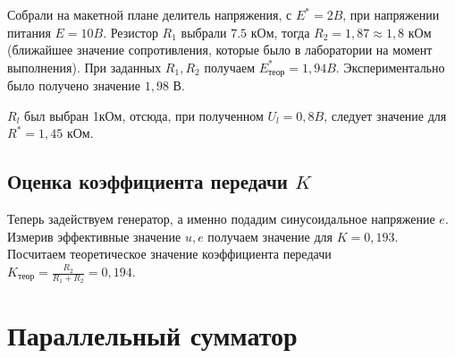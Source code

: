 \documentclass[a4paper, 12pt]{article}%
\begin{document}
Собрали на макетной плане делитель напряжения, с $E^{*} = 2 B$, при напряжении питания $E = 10 B$. Резистор $R_1$ выбрали $7.5 $ кОм, тогда $R_2 = 1,87 \approx 1,8$ кОм (ближайшее значение сопротивления, которые было в лаборатории на момент выполнения). При заданных $R_1, R_2$ получаем $E^{*}_{\text{теор}} = 1,94 B$. Экспериментально было получено значение $1,98$ В.

$R_l$ был выбран 1кОм, отсюда, при полученном $U_l = 0,8 B$, следует значение для $R^{*} = 1,45$ кОм.					
\subsection{Оценка коэффициента передачи $K$}

Теперь задействуем генератор, а именно подадим синусоидальное напряжение $e$. Измерив эффективные значение $u, e$ получаем значение для $K = 0,193$. Посчитаем теоретическое значение коэффициента передачи $K_{\text{теор}} = \frac{R_2}{R_1 + R_2} = 0,194$. 

\section{Параллельный сумматор}
					
					
\end{document}
